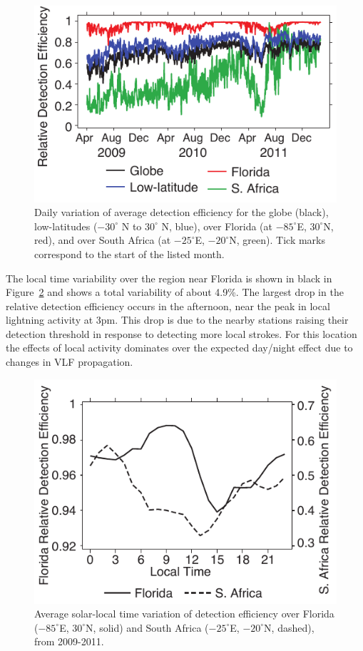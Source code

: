 \begin{figure}[ht!]
   \centering
\noindent\includegraphics[scale=1]{efficiency/Figures/2012RS005049-p10.pdf}
   \caption{Daily variation of average detection efficiency for the globe (black), low-latitudes ($-30^\circ$ N to $30^\circ$ N, blue), over Florida (at $-85^\circ$E, $30^\circ$N, red), and over South Africa (at $-25^\circ$E, $-20^\circ$N, green).
   Tick marks correspond to the start of the listed month.}
   \label{efficiency:fig:deTrendLocal}
\end{figure}

The local time variability over the region near Florida is shown in black in Figure~\ref{efficiency:fig:deUTC} and shows a total variability of about 4.9\%.
The largest drop in the relative detection efficiency occurs in the afternoon, near the peak in local lightning activity at 3pm.
This drop is due to the nearby stations raising their detection threshold in response to detecting more local strokes.
For this location the effects of local activity dominates over the expected day/night effect due to changes in VLF propagation.

\begin{figure}[ht!]
   \centering
\noindent\includegraphics[scale=1]{efficiency/Figures/2012RS005049-f11.pdf}
   \caption{Average solar-local time variation of detection efficiency over Florida ($-85^\circ$E, $30^\circ$N, solid) and South Africa ($-25^\circ$E, $-20^\circ$N, dashed), from 2009-2011.}
   \label{efficiency:fig:deUTC}
\end{figure}

